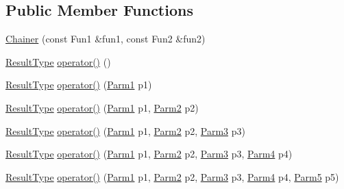 \subsection*{Public Member Functions}
\begin{DoxyCompactItemize}
\item 
\mbox{\hyperlink{classUtil_1_1Chainer_a326196e6b1b7c50ca66c8930d2274007}{Chainer}} (const Fun1 \&fun1, const Fun2 \&fun2)
\item 
\mbox{\hyperlink{classUtil_1_1Chainer_a2c8d88a77b8ba93eb915dc799ddafbb9}{Result\+Type}} \mbox{\hyperlink{classUtil_1_1Chainer_a4eac17d2597562e63056bab3e1ab8046}{operator()}} ()
\item 
\mbox{\hyperlink{classUtil_1_1Chainer_a2c8d88a77b8ba93eb915dc799ddafbb9}{Result\+Type}} \mbox{\hyperlink{classUtil_1_1Chainer_a44584550044ef436126ff4293c9502da}{operator()}} (\mbox{\hyperlink{classUtil_1_1Chainer_a3e09b2267dabdd8d12070b09c47749c6}{Parm1}} p1)
\item 
\mbox{\hyperlink{classUtil_1_1Chainer_a2c8d88a77b8ba93eb915dc799ddafbb9}{Result\+Type}} \mbox{\hyperlink{classUtil_1_1Chainer_af5e43ed56a289b68e7704727ef552208}{operator()}} (\mbox{\hyperlink{classUtil_1_1Chainer_a3e09b2267dabdd8d12070b09c47749c6}{Parm1}} p1, \mbox{\hyperlink{classUtil_1_1Chainer_a1bfb0e8f35679278c85d232a74a107ff}{Parm2}} p2)
\item 
\mbox{\hyperlink{classUtil_1_1Chainer_a2c8d88a77b8ba93eb915dc799ddafbb9}{Result\+Type}} \mbox{\hyperlink{classUtil_1_1Chainer_af0f81081283f192626e5a83eb688f573}{operator()}} (\mbox{\hyperlink{classUtil_1_1Chainer_a3e09b2267dabdd8d12070b09c47749c6}{Parm1}} p1, \mbox{\hyperlink{classUtil_1_1Chainer_a1bfb0e8f35679278c85d232a74a107ff}{Parm2}} p2, \mbox{\hyperlink{classUtil_1_1Chainer_ac28811d7153f7b7cf837f7b8626436c8}{Parm3}} p3)
\item 
\mbox{\hyperlink{classUtil_1_1Chainer_a2c8d88a77b8ba93eb915dc799ddafbb9}{Result\+Type}} \mbox{\hyperlink{classUtil_1_1Chainer_aebe5bd1cb7c2523124ccdf2b406ff7d1}{operator()}} (\mbox{\hyperlink{classUtil_1_1Chainer_a3e09b2267dabdd8d12070b09c47749c6}{Parm1}} p1, \mbox{\hyperlink{classUtil_1_1Chainer_a1bfb0e8f35679278c85d232a74a107ff}{Parm2}} p2, \mbox{\hyperlink{classUtil_1_1Chainer_ac28811d7153f7b7cf837f7b8626436c8}{Parm3}} p3, \mbox{\hyperlink{classUtil_1_1Chainer_a82e756f3083e3883a05644425474f789}{Parm4}} p4)
\item 
\mbox{\hyperlink{classUtil_1_1Chainer_a2c8d88a77b8ba93eb915dc799ddafbb9}{Result\+Type}} \mbox{\hyperlink{classUtil_1_1Chainer_a3aee5b0f14ad8a15d167dd319019a01a}{operator()}} (\mbox{\hyperlink{classUtil_1_1Chainer_a3e09b2267dabdd8d12070b09c47749c6}{Parm1}} p1, \mbox{\hyperlink{classUtil_1_1Chainer_a1bfb0e8f35679278c85d232a74a107ff}{Parm2}} p2, \mbox{\hyperlink{classUtil_1_1Chainer_ac28811d7153f7b7cf837f7b8626436c8}{Parm3}} p3, \mbox{\hyperlink{classUtil_1_1Chainer_a82e756f3083e3883a05644425474f789}{Parm4}} p4, \mbox{\hyperlink{classUtil_1_1Chainer_ac5fdddd223aac1cfb37abd6d681ddf69}{Parm5}} p5)

\end{DoxyCompactItemize}

